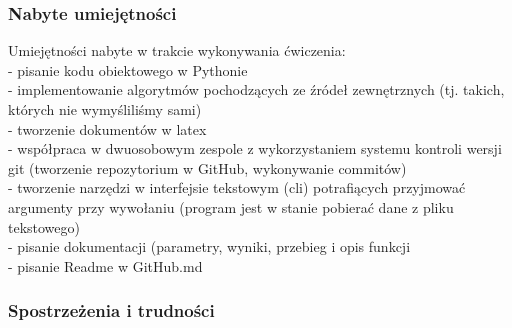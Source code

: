 \documentclass[11pt,a4paper]{article}
\begin{document}
\subsubsection{Nabyte umiejętności}
Umiejętności nabyte w trakcie wykonywania ćwiczenia:\\
 - pisanie kodu obiektowego w Pythonie\\
- implementowanie algorytmów pochodzących ze źródeł zewnętrznych (tj. takich, których nie wymyśliliśmy sami)\\
- tworzenie dokumentów w latex\\
- współpraca w dwuosobowym zespole z wykorzystaniem systemu kontroli wersji git (tworzenie repozytorium w GitHub, wykonywanie commitów)\\
- tworzenie narzędzi w interfejsie tekstowym (cli) potrafiących przyjmować argumenty przy wywołaniu (program jest w stanie pobierać dane z pliku tekstowego)\\
- pisanie dokumentacji (parametry, wyniki, przebieg i opis funkcji\\
- pisanie Readme w GitHub.md\\

\subsubsection{Spostrzeżenia i trudności }
\end{document}
